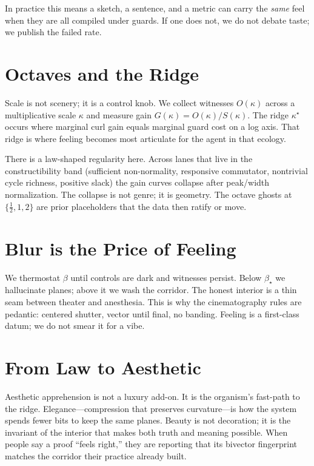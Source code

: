 \documentclass[11pt]{article}
\newcommand{\1}{\mathbf{1}}
\newcommand{\Slack}{S}
\newcommand{\Blur}{\beta}
\begin{document}
In practice this means a sketch, a sentence, and a metric can carry the \emph{same} feel when they are all compiled under guards. If one does not, we do not debate taste; we publish the failed rate.

\section{Octaves and the Ridge}
Scale is not scenery; it is a control knob. We collect witnesses $O(\kappa)$ across a multiplicative scale $\kappa$ and measure gain $G(\kappa)=O(\kappa)/\Slack(\kappa)$. The ridge $\kappa^\star$ occurs where marginal curl gain equals marginal guard cost on a log axis. That ridge is where feeling becomes most articulate for the agent in that ecology.

There is a law-shaped regularity here. Across lanes that live in the constructibility band (sufficient non-normality, responsive commutator, nontrivial cycle richness, positive slack) the gain curves collapse after peak/width normalization. The collapse is not genre; it is geometry. The octave ghosts at $\{\tfrac12,1,2\}$ are prior placeholders that the data then ratify or move.

\section{Blur is the Price of Feeling}
We thermostat $\Blur$ until controls are dark and witnesses persist. Below $\Blur_\star$ we hallucinate planes; above it we wash the corridor. The honest interior is a thin seam between theater and anesthesia. This is why the cinematography rules are pedantic: centered shutter, vector until final, no banding. Feeling is a first-class datum; we do not smear it for a vibe.

\section{From Law to Aesthetic}
Aesthetic apprehension is not a luxury add-on. It is the organism's fast-path to the ridge. Elegance---compression that preserves curvature---is how the system spends fewer bits to keep the same planes. Beauty is not decoration; it is the invariant of the interior that makes both truth and meaning possible. When people say a proof ``feels right,'' they are reporting that its bivector fingerprint matches the corridor their practice already built.
\end{document}
